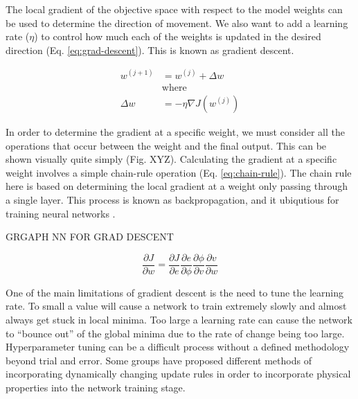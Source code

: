The local gradient of the objective space with respect to the model weights can be used to determine the direction of movement. We also want to add a learning rate ($\eta$) to control how much each of the weights is updated in the desired direction (Eq. \ref{eq:grad-descent}). This is known as gradient descent.

\begin{equation}
    \begin{aligned}
        w^{(j+1)} &= w^{(j)} + \Delta w\\
        &\text{where} \\
        \Delta w &= -\eta \nabla J(w^{(j)})
    \end{aligned}
    \label{eq:grad-descent}
\end{equation}

In order to determine the gradient at a specific weight, we must consider all the operations that occur between the weight and the final output. This can be shown visually quite simply (Fig. XYZ). Calculating the gradient at a specific weight involves a simple chain-rule operation (Eq. \ref{eq:chain-rule}). The chain rule here is based on determining the local gradient at a weight only passing through a single layer. This process is known as backpropagation, and it ubiqutious for training neural networks \cite{rumelhartLearningRepresentationsBackpropagating1986}.

\begin{center}
    \Large{GRGAPH NN FOR GRAD DESCENT}
\end{center}

\begin{equation}
    \frac{\partial J}{\partial w} = \frac{\partial J}{\partial e}\frac{\partial e}{\partial \phi}\frac{\partial \phi}{\partial v} \frac{\partial v}{\partial w}
    \label{eq:chain-rule}
\end{equation}

One of the main limitations of gradient descent is the need to tune the learning rate. To small a value will cause a network to train extremely slowly and almost always get stuck in local minima. Too large a learning rate can cause the network to ``bounce out'' of the global minima due to the rate of change being too large. Hyperparameter tuning can be a difficult process without a defined methodology beyond trial and error. Some groups have proposed different methods of incorporating dynamically changing update rules in order to incorporate physical properties into the network training stage. 